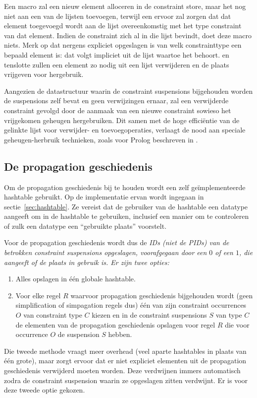 {Een  macro zal een nieuw element alloceren in de constraint store, maar het nog niet aan een van de lijsten toevoegen, terwijl een  ervoor zal zorgen dat dat element toegevoegd wordt aan de lijst overeenkomstig met het type constraint van dat element. Indien de constraint zich al in die lijst bevindt, doet deze macro niets. Merk op dat nergens expliciet opgeslagen is van welk constrainttype een bepaald element is: dat volgt impliciet uit de lijst waartoe het behoort.  en  tenslotte zullen een element zo nodig uit een lijst verwijderen en de plaats vrijgeven voor hergebruik.

Aangezien de datastructuur waarin de constraint suspensions bijgehouden worden de suspensions zelf bevat en geen verwijzingen ernaar, zal een verwijderde constraint gevolgd door de aanmaak van een nieuwe constraint sowieso het vrijgekomen geheugen hergebruiken. Dit samen met de hoge effici\"entie van de gelinkte lijst voor verwijder- en toevoegoperaties, verlaagt de nood aan speciale geheugen-herbruik technieken, zoals voor Prolog beschreven in \cite{jon:memory_reuse}.

\subsection{De propagation geschiedenis} \label{sec:prophist}


Om de propagation geschiedenis bij te houden wordt een zelf ge\"implementeerde hashtable gebruikt. Op de implementatie ervan wordt ingegaan in sectie~\ref{sec:hashtable}. Ze vereist dat de gebruiker van de hashtable een datatype aangeeft om in de hashtable te gebruiken, inclusief een manier om te controleren of zulk een datatype een ``gebruikte plaats'' voorstelt.

Voor de propagation geschiedenis wordt dus de \em{ID}s (niet de \em{PID}s) van de betrokken constraint suspensions opgeslagen, voorafgegaan door een $0$ of een $1$, die aangeeft of de plaats in gebruik is. Er zijn twee opties: \begin{enumerate}
  \item Alles opslagen in \'e\'en globale hashtable.
  \item Voor elke regel $R$ waarvoor propagation geschiedenis bijgehouden wordt (geen simplification of simpagation regels dus) \'e\'en van zijn constraint occurrences $O$ van constraint type $C$ kiezen en in de constraint suspensions $S$ van type $C$ de elementen van de propagation geschiedenis opslagen voor regel $R$ die voor occurrence $O$ de suspension $S$ hebben.
\end{enumerate}
Die tweede methode vraagt meer overhead (veel aparte hashtables in plaats van \'e\'en grote), maar zorgt ervoor dat er niet expliciet elementen uit de propagation geschiedenis verwijderd moeten worden. Deze verdwijnen immers automatisch zodra de constraint suspension waarin ze opgeslagen zitten verdwijnt. Er is voor deze tweede optie gekozen.

}
